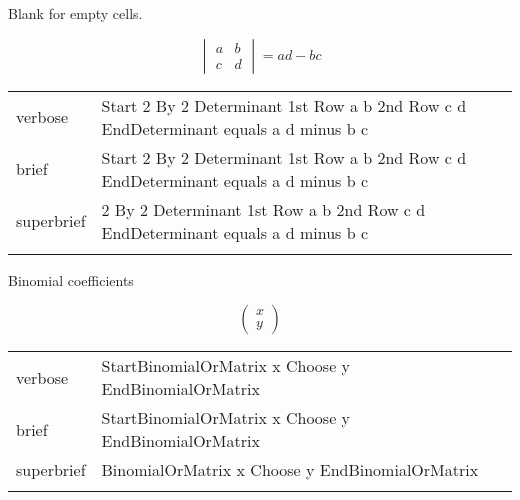 \R
Blank for empty cells.

\R
\E \[
\begin{vmatrix}
  a & b\\
  c & d
\end{vmatrix}
= a d - b c
\]

\begin{longtable}[c]{@{}lll@{}}
\toprule\addlinespace
verbose & Start 2 By 2 Determinant 1st Row a b 2nd Row c d
EndDeterminant equals a d minus b c &

\\\addlinespace
brief & Start 2 By 2 Determinant 1st Row a b 2nd Row c d EndDeterminant
equals a d minus b c &

\\\addlinespace
superbrief & 2 By 2 Determinant 1st Row a b 2nd Row c d EndDeterminant
equals a d minus b c &

\\\addlinespace
\bottomrule
\end{longtable}

\R 
Binomial coefficients

\R
\E \[
\begin{pmatrix}
  x \\ y
\end{pmatrix}
\]

\begin{longtable}[c]{@{}lll@{}}
\toprule\addlinespace
verbose & StartBinomialOrMatrix x Choose y EndBinomialOrMatrix &

\\\addlinespace
brief & StartBinomialOrMatrix x Choose y EndBinomialOrMatrix &

\\\addlinespace
superbrief & BinomialOrMatrix x Choose y EndBinomialOrMatrix &

\\\addlinespace
\bottomrule
\end{longtable}






